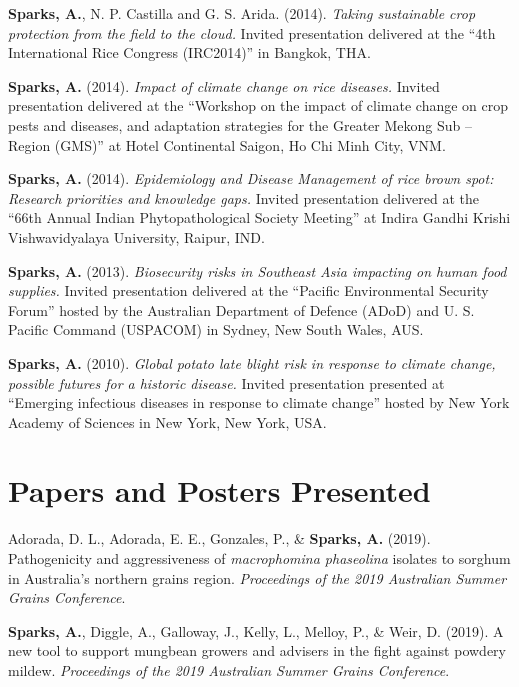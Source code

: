 \documentclass[11pt, a4paper]{awesome-cv}
\begin{document}
\textbf{Sparks, A.}, N. P. Castilla and G. S. Arida. (2014).
\emph{Taking sustainable crop protection from the field to the cloud.}
Invited presentation delivered at the ``4th International Rice Congress
(IRC2014)'' in Bangkok, THA.

\textbf{Sparks, A.} (2014). \emph{Impact of climate change on rice
diseases.} Invited presentation delivered at the ``Workshop on the
impact of climate change on crop pests and diseases, and adaptation
strategies for the Greater Mekong Sub -- Region (GMS)'' at Hotel
Continental Saigon, Ho Chi Minh City, VNM.

\textbf{Sparks, A.} (2014). \emph{Epidemiology and Disease Management of
rice brown spot: Research priorities and knowledge gaps.} Invited
presentation delivered at the ``66th Annual Indian Phytopathological
Society Meeting'' at Indira Gandhi Krishi Vishwavidyalaya University,
Raipur, IND.

\textbf{Sparks, A.} (2013). \emph{Biosecurity risks in Southeast Asia
impacting on human food supplies.} Invited presentation delivered at the
``Pacific Environmental Security Forum'' hosted by the Australian
Department of Defence (ADoD) and U. S. Pacific Command (USPACOM) in
Sydney, New South Wales, AUS.

\textbf{Sparks, A.} (2010). \emph{Global potato late blight risk in
response to climate change, possible futures for a historic disease.}
Invited presentation presented at ``Emerging infectious diseases in
response to climate change'' hosted by New York Academy of Sciences in
New York, New York, USA.

\endgroup

\hypertarget{papers-and-posters-presented}{%
\section{Papers and Posters
Presented}\label{papers-and-posters-presented}}

\begingroup
\setlength{\parindent}{-0.5in}
\setlength{\leftskip}{0.5in}

\hypertarget{refs_proceedings}{}
\leavevmode\hypertarget{ref-Adorada2019}{}%
Adorada, D. L., Adorada, E. E., Gonzales, P., \& \textbf{Sparks, A.}
(2019). Pathogenicity and aggressiveness of \emph{macrophomina
phaseolina} isolates to sorghum in {Australia's} northern grains region.
\emph{Proceedings of the 2019 Australian Summer Grains Conference}.

\leavevmode\hypertarget{ref-Sparks2019ASGC}{}%
\textbf{Sparks, A.}, Diggle, A., Galloway, J., Kelly, L., Melloy, P., \&
Weir, D. (2019). A new tool to support mungbean growers and advisers in
the fight against powdery mildew. \emph{Proceedings of the 2019
Australian Summer Grains Conference}.
\end{document}
